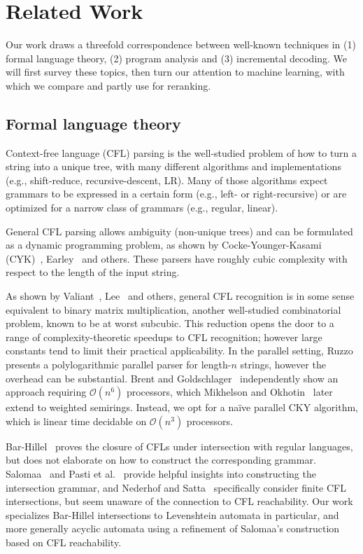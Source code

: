\documentclass[popl.tex]{subfiles}
\begin{document}
\clearpage\section{Related Work}\label{sec:related}

Our work draws a threefold correspondence between well-known techniques in (1) formal language theory, (2) program analysis and (3) incremental decoding. We will first survey these topics, then turn our attention to machine learning, with which we compare and partly use for reranking.

\subsection{Formal language theory}

Context-free language (CFL) parsing is the well-studied problem of how to turn a string into a unique tree, with many different algorithms and implementations (e.g., shift-reduce, recursive-descent, LR). Many of those algorithms expect grammars to be expressed in a certain form (e.g., left- or right-recursive) or are optimized for a narrow class of grammars (e.g., regular, linear).

General CFL parsing allows ambiguity (non-unique trees) and can be formulated as a dynamic programming problem, as shown by Cocke-Younger-Kasami (CYK)~\cite{sakai1961syntax}, Earley~\cite{earley1970efficient} and others. These parsers have roughly cubic complexity with respect to the length of the input string.

As shown by Valiant~\cite{valiant1975general}, Lee~\cite{lee2002fast} and others, general CFL recognition is in some sense equivalent to binary matrix multiplication, another well-studied combinatorial problem, known to be at worst subcubic. This reduction opens the door to a range of complexity-theoretic speedups to CFL recognition; however large constants tend to limit their practical applicability. In the parallel setting, Ruzzo~\cite{ruzzo1978general} presents a polylogarithmic parallel parser for length-\(n\) strings, however the overhead can be substantial. Brent and Goldschlager~\cite{brent1984parallel} independently show an approach requiring $\mathcal{O}(n^6)$ processors, which Mikhelson and Okhotin~\cite{mikhelson2025parallel} later extend to weighted semirings. Instead, we opt for a na\"ive parallel CKY algorithm, which is linear time decidable on $\mathcal{O}(n^3)$ processors.

Bar-Hillel~\cite{bar1961formal} proves the closure of CFLs under intersection with regular languages, but does not elaborate on how to construct the corresponding grammar. Salomaa~\cite{salomaa1973formal} and Pasti et al.~\cite{pasti2023intersection} provide helpful insights into constructing the intersection grammar, and Nederhof and Satta~\cite{nederhof2004language} specifically consider finite CFL intersections, but seem unaware of the connection to CFL reachability. Our work specializes Bar-Hillel intersections to Levenshtein automata in particular, and more generally acyclic automata using a refinement of Salomaa's construction~\cite{salomaa1973formal} based on CFL reachability.
\end{document}

